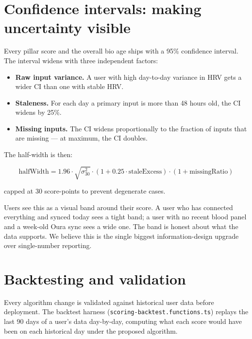 \documentclass[11pt, a4paper]{article}
\begin{document}
\section{Confidence intervals: making uncertainty visible}

Every pillar score and the overall bio age ships with a 95\% confidence interval. The interval widens with three independent factors:

\begin{itemize}
  \item \textbf{Raw input variance.} A user with high day-to-day variance in HRV gets a wider CI than one with stable HRV.
  \item \textbf{Staleness.} For each day a primary input is more than 48 hours old, the CI widens by 25\%.
  \item \textbf{Missing inputs.} The CI widens proportionally to the fraction of inputs that are missing --- at maximum, the CI doubles.
\end{itemize}

The half-width is then:

\begin{equation}
\text{halfWidth} = 1.96 \cdot \sqrt{\sigma^2_{30}} \cdot (1 + 0.25 \cdot \text{staleExcess}) \cdot (1 + \text{missingRatio})
\end{equation}

capped at 30 score-points to prevent degenerate cases.

Users see this as a visual band around their score. A user who has connected everything and synced today sees a tight band; a user with no recent blood panel and a week-old Oura sync sees a wide one. The band is honest about what the data supports. We believe this is the single biggest information-design upgrade over single-number reporting.

\section{Backtesting and validation}

Every algorithm change is validated against historical user data before deployment. The backtest harness (\texttt{scoring-backtest.functions.ts}) replays the last 90 days of a user's data day-by-day, computing what each score would have been on each historical day under the proposed algorithm.
\end{document}
